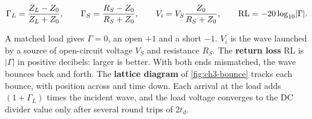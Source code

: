 \begin{keyeq}
\begin{equation}
  \Gamma_L = \frac{Z_L - Z_0}{Z_L + Z_0}, \qquad
  \Gamma_S = \frac{R_S - Z_0}{R_S + Z_0}, \qquad
  V_i = V_S\frac{Z_0}{R_S + Z_0}, \qquad
  \mathrm{RL} = -20\log_{10}\lvert\Gamma\rvert .
  \label{eq:ch3-gamma}
\end{equation}
\end{keyeq}
A matched load gives $\Gamma = 0$, an open $+1$ and a short $-1$. $V_i$ is the wave launched by a source of open-circuit voltage $V_S$ and resistance $R_S$. The \textbf{return loss} RL is $\lvert\Gamma\rvert$ in positive decibels: larger is better. With both ends mismatched, the wave bounces back and forth. The \textbf{lattice diagram} of \cref{fig:ch3-bounce} tracks each bounce, with position across and time down. Each arrival at the load adds $(1+\Gamma_L)$ times the incident wave, and the load voltage converges to the DC divider value only after several round trips of $2t_d$.

